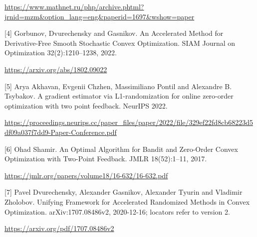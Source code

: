 \documentclass[10pt,a4paper]{article}
\begin{document}
\url{https://www.mathnet.ru/php/archive.phtml?jrnid=mzm&option_lang=eng&paperid=1697&wshow=paper}

[4] Gorbunov, Dvurechensky and Gasnikov. An Accelerated Method for Derivative-Free Smooth Stochastic Convex Optimization. SIAM Journal on Optimization 32(2):1210--1238, 2022.

\url{https://arxiv.org/abs/1802.09022}

[5] Arya Akhavan, Evgenii Chzhen, Massimiliano Pontil and Alexandre B. Tsybakov. A gradient estimator via L1-randomization for online zero-order optimization with two point feedback. NeurIPS 2022.

\url{https://proceedings.neurips.cc/paper_files/paper/2022/file/329ef22fd8cb68223d5df09a037f7dd9-Paper-Conference.pdf}

[6] Ohad Shamir. An Optimal Algorithm for Bandit and Zero-Order Convex Optimization with Two-Point Feedback. JMLR 18(52):1--11, 2017.

\url{https://jmlr.org/papers/volume18/16-632/16-632.pdf}

[7] Pavel Dvurechensky, Alexander Gasnikov, Alexander Tyurin and Vladimir Zholobov. Unifying Framework for Accelerated Randomized Methods in Convex Optimization. arXiv:1707.08486v2, 2020-12-16; locators refer to version 2.

\url{https://arxiv.org/pdf/1707.08486v2}
\end{document}
